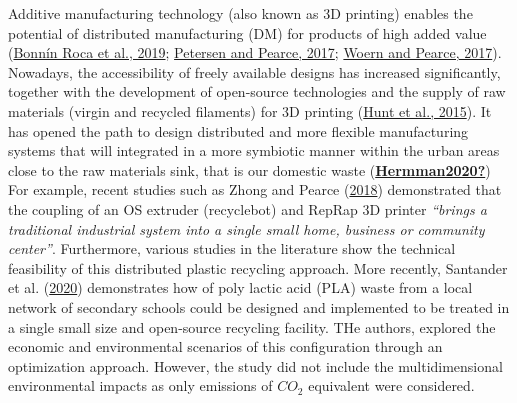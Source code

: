 \documentclass[12pt]{elsarticle} %
\begin{document}
Additive manufacturing technology (also known as 3D printing) enables the potential of distributed manufacturing (DM) for products of high added value (\protect\hyperlink{ref-BonninRoca2019}{Bonnín Roca et al., 2019}; \protect\hyperlink{ref-Petersen2017a}{Petersen and Pearce, 2017}; \protect\hyperlink{ref-Woern2017}{Woern and Pearce, 2017}).
Nowadays, the accessibility of freely available designs has increased significantly, together with the development of open-source technologies and the supply of raw materials (virgin and recycled filaments) for 3D printing (\protect\hyperlink{ref-Hunt2015}{Hunt et al., 2015}).
It has opened the path to design distributed and more flexible manufacturing systems that will integrated in a more symbiotic manner within the urban areas close to the raw materials sink, that is our domestic waste (\protect\hyperlink{ref-Hermman2020}{\textbf{Hermman2020?}})
For example, recent studies such as Zhong and Pearce (\protect\hyperlink{ref-Zhong2018}{2018}) demonstrated that the coupling of an OS extruder (recyclebot) and RepRap 3D printer \emph{``brings a traditional industrial system into a single small home, business or community center''}.
Furthermore, various studies in the literature show the technical feasibility of this distributed plastic recycling approach.
More recently, Santander et al. (\protect\hyperlink{ref-Santander2020}{2020}) demonstrates how of poly lactic acid (PLA) waste from a local network of secondary schools could be designed and implemented to be treated in a single small size and open-source recycling facility.
THe authors, explored the economic and environmental scenarios of this configuration through an optimization approach. However, the study did not include the multidimensional environmental impacts as only emissions of \(CO_{2}\) equivalent were considered.
\end{document}
